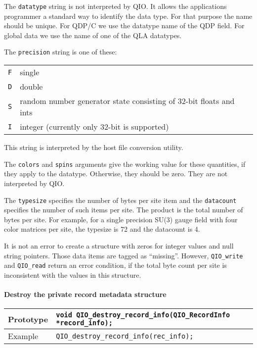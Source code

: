 \documentclass{article}
\begin{document}
The \verb|datatype| string is not interpreted by QIO\@.  It allows the
applications programmer a standard way to identify the data type.  For
that purpose the name should be unique.  For QDP/C we use the datatype
name of the QDP field.  For global data we use the name of one of the
QLA datatypes.  

The \verb|precision| string is one of these:
%
\begin{flushleft}
  \begin{tabular}{|l|l|}
\hline
    \verb|F| & single \\
    \verb|D| & double \\
    \verb|S| & random number generator state consisting of 32-bit floats and ints \\
    \verb|I| & integer (currently only 32-bit is supported)\\
\hline
  \end{tabular}
\end{flushleft}
%
This string is interpreted by the host file conversion utility.

The \verb|colors| and \verb|spins| arguments give the working value
for these quantities, if they apply to the datatype.  Otherwise, they
should be zero.  They are not interpreted by QIO\@.

The \verb|typesize| specifies the number of bytes per site item and
the \verb|datacount| specifies the number of such items per site.  The
product is the total number of bytes per site.  For example, for a
single precision SU(3) gauge field with four color matrices per site,
the typesize is 72 and the datacount is 4.

It is not an error to create a structure with zeros for integer values
and null string pointers.  Those data items are tagged as ``missing''.
However, \verb|QIO_write| and \verb|QIO_read| return an error
condition, if the total byte count per site is inconsistent with the
values in this structure.

\paragraph{Destroy the private record metadata structure}
%
\begin{flushleft}
  \begin{tabular}{|l|l|}
  \hline
  Prototype      & \verb|void QIO_destroy_record_info(QIO_RecordInfo *record_info);| \\
\hline
  Example  & \verb|QIO_destroy_record_info(rec_info);|\\
   \hline
 \end{tabular}
\end{flushleft}
%
\end{document}
